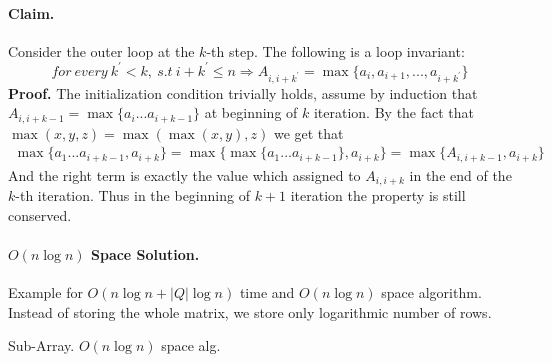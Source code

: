 \paragraph{Claim.} Consider the outer loop at the \(k\)-th step. The following is a loop invariant: \[for \ every \ k^\prime < k ,\ s.t \ i + k^\prime \le n \Rightarrow A_{i,i+k^\prime} = \max{ \{ a_{i}, a_{i+1}, ... ,a_{i + k^\prime} \} }\]  
\textbf{Proof.} The initialization condition trivially holds, assume by induction that \( A_{i,i+k-1} = \max{\{a_i ... a_{i+k-1}\}}\) at beginning of \( k \) iteration. By the fact that \( \max(x,y,z)= \max(\max(x,y),z) \) we get that
\begin{equation*}
\begin{split}
 \max{\{a_1 ... a_{i + k-1}, a_{i+ k} \}} = \max{\{ \max{ \{ a_1 ... a_{i + k-1} \} }, a_{i+ k} \}} =  \max{\{A_{i,i+k-1}, a_{i+ k} \}}
 \end{split}    
 \end{equation*} And the right term is exactly the value which assigned to \(A_{i,i+k}\) in the end of the\(k\)-th iteration. Thus in the beginning of \( k+1 \) iteration the property is still conserved.

\paragraph{ \(O\left(n\log n\right)\) Space Solution.} Example for \(O\left(n\log n + |Q|\log n\right)\) time and \(O\left(n\log n\right)\) space algorithm. Instead of storing the whole matrix, we store only logarithmic number of rows.   

%
\begin{algorithm}
  \caption{Sub-Array. \(O(n \log n )\) space alg.}
\end{algorithm}
%






